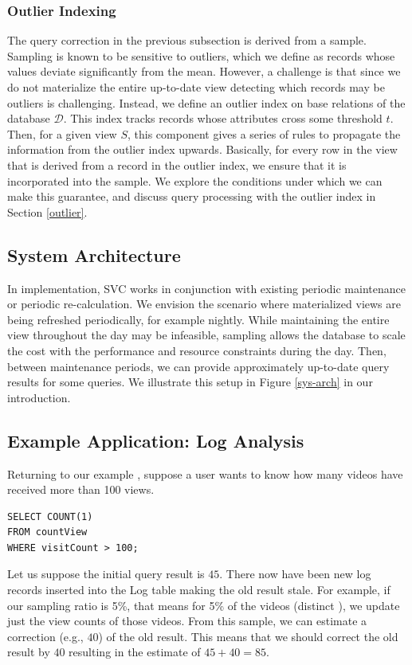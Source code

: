 \subsubsection{Outlier Indexing}
The query correction in the previous subsection is derived from a sample.
Sampling is known to be sensitive to outliers, which we define as records whose values deviate significantly from the mean.
However, a challenge is that since we do not materialize the entire up-to-date view detecting which records may be outliers is challenging.
Instead, we define an outlier index on base relations of the database $\mathcal{D}$.
This index tracks records whose attributes cross some threshold $t$.
Then, for a given view $S$, this component gives a series of rules to propagate the information from the outlier index upwards.
Basically, for every row in the view that is derived from a record in the outlier index, we ensure that it is incorporated into the sample.
We explore the conditions under which we can make this guarantee, and discuss query processing with the outlier index in Section \ref{outlier}.

\subsection{System Architecture}
In implementation, SVC works in conjunction with existing periodic maintenance or periodic re-calculation.
We envision the scenario where materialized views are being refreshed periodically, for example nightly.
While maintaining the entire view throughout the day may be infeasible, sampling allows the database to scale the cost with the performance and resource constraints during the day.
Then, between maintenance periods, we can provide approximately up-to-date query results for some queries.
We illustrate this setup in Figure \ref{sys-arch} in our introduction.
 
\subsection{Example Application: Log Analysis}
Returning to our example , suppose a user wants to know how many videos have received more than 100 views.
\begin{lstlisting} 
SELECT COUNT(1)
FROM countView
WHERE visitCount > 100;
\end{lstlisting}
Let us suppose the initial query result is $45$.
There now have been new log records inserted into the Log table making the old result stale.
For example, if our sampling ratio is 5\%, that means for 5\% of the videos (distinct ), we update just the view counts of those videos.
From this sample, we can estimate a correction (e.g., $40$) of the old result.
This means that we should correct the old result by $40$ resulting in the estimate of $45+40 = 85$.


